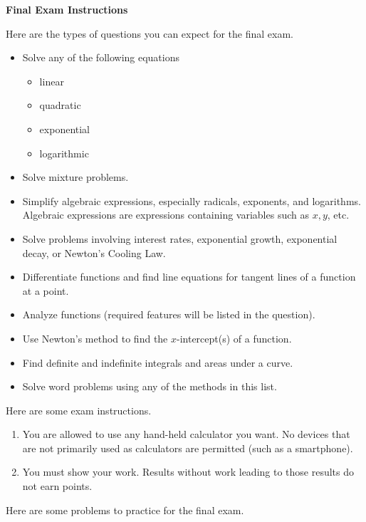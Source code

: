 \documentclass[11pt]{article}
\begin{document}
\textbf{Final Exam Instructions}

Here are the types of questions you can expect for the final exam.

\begin{itemize}
\item Solve any of the following equations
  \begin{itemize}
  \item linear
  \item quadratic
  \item exponential
  \item logarithmic
  \end{itemize}
\item Solve mixture problems.
\item Simplify algebraic expressions, especially radicals, exponents,
  and logarithms. Algebraic expressions are expressions containing
  variables such as $x,y$, etc.
\item Solve problems involving interest rates, exponential growth,
  exponential decay, or Newton's Cooling Law.
\item Differentiate functions and find line equations for tangent
  lines of a function at a point.
\item Analyze functions (required features will be listed in the
  question).
\item Use Newton's method to find the $x$-intercept(s) of a function.
\item Find definite and indefinite integrals and areas under a curve.
\item Solve word problems using any of the methods in this list.
\end{itemize}

Here are some exam instructions.

\begin{enumerate}
\item You are allowed to use any hand-held calculator you want. No
  devices that are not primarily used as calculators are permitted
  (such as a smartphone).
\item You must show your work. Results without work leading to those
  results do not earn points.
\end{enumerate}

Here are some problems to practice for the final exam.
\end{document}
